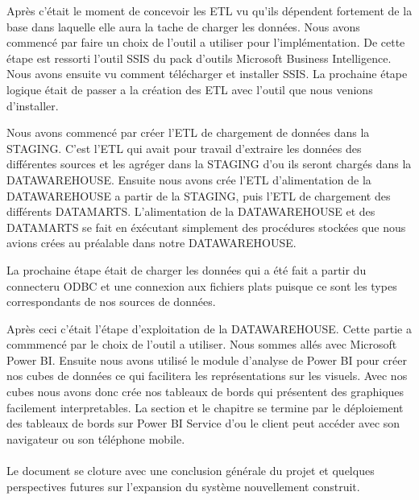 Après c'était le moment de concevoir les ETL vu qu'ils dépendent fortement de la base dans laquelle elle aura la tache de charger les données. Nous avons commencé par faire un choix de l'outil a utiliser pour l'implémentation. De cette étape est ressorti l'outil SSIS du pack d'outils Microsoft Business Intelligence. Nous avons ensuite vu comment télécharger et installer SSIS. La prochaine étape logique était de passer a la création des ETL avec l'outil que nous venions d'installer. 

Nous avons commencé par créer l'ETL de chargement de données dans la STAGING. C'est l'ETL qui avait pour travail d'extraire les données des différentes sources et les agréger dans la STAGING d'ou ils seront chargés dans la DATAWAREHOUSE. Ensuite nous avons crée l'ETL d'alimentation de la DATAWAREHOUSE a partir de la STAGING, puis l'ETL de chargement des différents DATAMARTS. L'alimentation de la DATAWAREHOUSE et des DATAMARTS se fait en éxécutant simplement des procédures stockées que nous avions crées au préalable dans notre DATAWAREHOUSE. 

La prochaine étape était de charger les données qui a été fait a partir du connecteru ODBC et une connexion aux fichiers plats puisque ce sont les types correspondants de nos sources de données. 

Après ceci c'était l'étape d'exploitation de la DATAWAREHOUSE. Cette partie a commmencé par le choix de l'outil a utiliser. Nous sommes allés avec Microsoft Power BI. Ensuite nous avons utilisé le module d'analyse de Power BI pour créer nos cubes de données ce qui facilitera les représentations sur les visuels. Avec nos cubes nous avons donc crée nos tableaux de bords qui présentent des graphiques facilement interpretables. La section et le chapitre se termine par le déploiement des tableaux de bords sur Power BI Service d'ou le client peut accéder avec son navigateur ou son téléphone mobile.


\paragraph{}
Le document se cloture avec une conclusion générale du projet et quelques perspectives futures sur l'expansion du système nouvellement construit.

